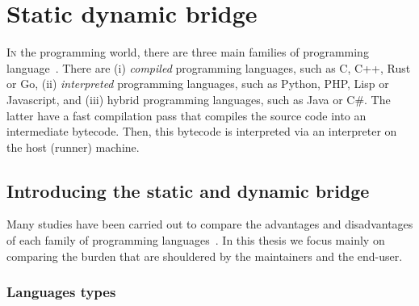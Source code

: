 \chapter{Static dynamic bridge}
\label{chap:static_dynamic_bridge}


\lettrine[lines=2]{I}{n} the programming world, there are three main families of programming
language~\parencite{prechelt.2000.comparison}. There are (i) \emph{compiled} programming languages, such as C, C++, Rust
or Go, (ii) \emph{interpreted} programming languages, such as Python, PHP, Lisp or Javascript, and (iii) hybrid
programming languages, such as Java or C\#. The latter have a fast compilation pass that compiles the source code into
an intermediate bytecode. Then, this bytecode is interpreted via an interpreter on the host (runner) machine.


\section{Introducing the static and dynamic bridge}

Many studies have been carried out to compare the advantages and disadvantages of each family of programming
languages~\parencite{boehm.1984.economics}. In this thesis we focus mainly on comparing the burden that are shouldered
by the maintainers and the end-user.


\subsection{Languages types}


